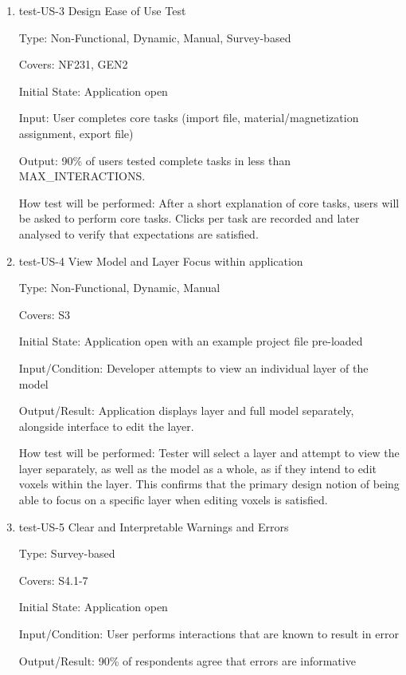 \documentclass[12pt, titlepage]{article}
\begin{document}
\begin{enumerate}
\item{test-US-3 Design Ease of Use Test\\}

Type: Non-Functional, Dynamic, Manual, Survey-based

Covers: NF231, GEN2 %
					
Initial State: Application open
					
Input: User completes core tasks (import file, material/magnetization assignment, export file)
					
Output: 90\% of users tested complete tasks in less than MAX\_INTERACTIONS.
					
How test will be performed: After a short explanation of core tasks, users will be asked to perform core tasks. Clicks per task
are recorded and later analysed to verify that expectations are satisfied.

\item{test-US-4 View Model and Layer Focus within application\\}

Type: Non-Functional, Dynamic, Manual

Covers: S3 %
					
Initial State: Application open with an example project file pre-loaded
					
Input/Condition: Developer attempts to view an individual layer of the model
					
Output/Result: Application displays layer and full model separately, alongside interface to edit the layer.
					
How test will be performed: Tester will select a layer and attempt to view the layer separately, as well as the model as a whole, 
as if they intend to edit voxels within the layer. This confirms that the primary design notion of being able to focus on a specific
layer when editing voxels is satisfied.

\item{test-US-5 Clear and Interpretable Warnings and Errors\\}

Type: Survey-based

Covers: S4.1-7 %
					
Initial State: Application open
					
Input/Condition: User performs interactions that are known to result in error
					
Output/Result: 90\% of respondents agree that errors are informative
					

\end{enumerate}
\end{document}
